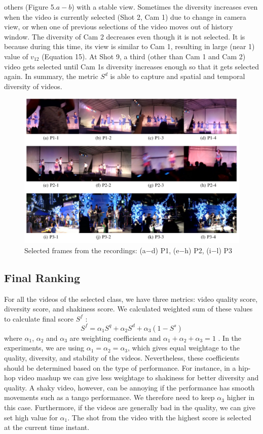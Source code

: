 \documentclass{new}
\begin{document}
others (Figure 5.$a-b$) with a stable view. Sometimes the diversity
increases even when the video is currently selected (Shot 2, Cam 1)
due to change in camera view, or when one of previous selections
of the video moves out of history window. The diversity of Cam 2
decreases even though it is not selected. It is because during this
time, its view is similar to Cam 1, resulting in large (near 1) value
of $v_12$ (Equation 15). At Shot 9, a third (other than Cam 1 and Cam
2) video gets selected until Cam 1\textquotesingle s diversity increases enough so that it gets selected again. In summary, the metric $S^d$ is able to capture and spatial and temporal diversity of videos.
\begin{figure}[h]
\includegraphics[width=1\textwidth]{img6}
\caption{Selected frames from the recordings: (a$-$d) P1, (e$-$h) P2, (i$-$l) P3}
\end{figure}
\subsection{Final Ranking}
For all the videos of the selected class, we have three metrics:
video quality score, diversity score, and shakiness score. We calculated weighted sum of these values to calculate final score $S^f$ :
\begin{equation}
    S^f = \alpha_1 S^q + \alpha_2 S^d + \alpha_3(1-S^s)
\end{equation}
where $\alpha_1$, $\alpha_2$ and $\alpha_3$ are weighting coefficients and $\alpha_1 + \alpha_2 + \alpha_3 = 1$ . In the experiments, we are using $\alpha_1 = \alpha_2 = \alpha_3$, which gives equal weightage to the quality, diversity, and stability of the videos. Nevertheless, these coefficients should be determined based on the type of performance. For instance, in a hip-hop video mashup we can give less weightage to shakiness for better diversity and quality. A shaky video, however, can be annoying if the performance has smooth movements such as a tango performance. We therefore need to keep $\alpha_3$ higher in this case. Furthermore, if the videos are generally bad in the quality, we can give set high value for $\alpha_1$. The shot from the video with the highest score is selected at the current time instant.
\end{document}
